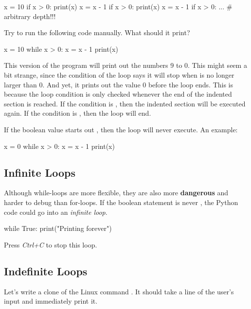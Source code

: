 \documentclass[11pt]{cselabheader}
\begin{document}
{\begin{python3code}
x = 10
if x > 0:
    print(x)
    x = x - 1
    if x > 0:
        print(x)
        x = x - 1
        if x > 0:
            ...  # arbitrary depth!!!
\end{python3code}

Try to run the following code manually. What should it print?

\begin{python3code}
x = 10
while x > 0:
    x = x - 1
    print(x)
\end{python3code}

This version of the program will print out the numbers 9 to 0. This
might seem a bit strange, since the condition of the loop says it will
stop when  is no longer larger than 0. And yet, it
prints out the value 0 before the loop ends. This is because the loop
condition is only checked whenever the end of the indented section is
reached. If the condition is , then the indented
section will be executed again. If the condition is
, then the loop will end.

If the boolean value starts out , then the loop
will never execute.  An example:

\begin{python3code}
x = 0
while x > 0:
    x = x - 1
    print(x)
\end{python3code}

\subsection{Infinite Loops}

Although
while-loops are more flexible, they are also more \textbf{dangerous} and harder
to debug than for-loops.  If the boolean statement is never
, the Python code could go into an \emph{infinite
loop}.

\begin{python3code}
while True:
    print("Printing forever")
\end{python3code}

Press \emph{Ctrl+C} to stop this loop.

\subsection{Indefinite Loops}

Let's write a clone of the Linux command .
It should take a line of the user's input and immediately print it.

}
\end{document}

